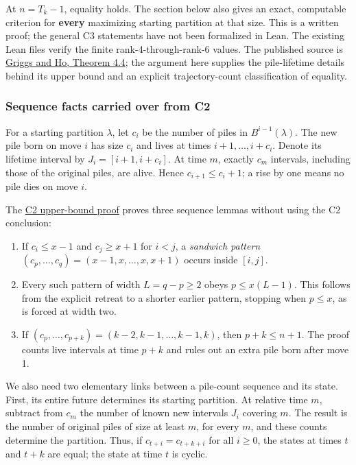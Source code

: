 \documentclass[11pt,a4paper]{article}
\providecommand{\tightlist}{\setlength{\itemsep}{0pt}\setlength{\parskip}{0pt}}
\begin{document}
At \(n=T_k-1\), equality holds. The section below also gives an exact, computable criterion for \textbf{every} maximizing starting partition at that size. This is a written proof; the general C3 statements have not been formalized in Lean. The existing Lean files verify the finite rank-4-through-rank-6 values. The published source is \href{https://sc.edu/study/colleges_schools/artsandsciences/mathematics/research/imi/research/documents/1998/1998_12.pdf}{Griggs and Ho, Theorem 4.4}; the argument here supplies the pile-lifetime details behind its upper bound and an explicit trajectory-count classification of equality.

\subsubsection{Sequence facts carried over from C2}\label{sequence-facts-carried-over-from-c2}

For a starting partition \(\lambda\), let \(c_i\) be the number of piles in \(B^{i-1}(\lambda)\). The new pile born on move \(i\) has size \(c_i\) and lives at times \(i+1,\ldots,i+c_i\). Denote its lifetime interval by \(J_i=[i+1,i+c_i]\). At time \(m\), exactly \(c_m\) intervals, including those of the original piles, are alive. Hence \(c_{i+1}\le c_i+1\); a rise by one means no pile dies on move \(i\).

The \href{https://github.com/mpelteshki/climbing-to-the-frontier/blob/212bba53b1818c08c40b8c4b48f636651eaf6410/cagent/p3/c2/upper-bound-proof.md}{C2 upper-bound proof} proves three sequence lemmas without using the C2 conclusion:

\begin{enumerate}
\def\labelenumi{\arabic{enumi}.}
\tightlist
\item
  If \(c_i\le x-1\) and \(c_j\ge x+1\) for \(i<j\), a \emph{sandwich pattern} \((c_p,\ldots,c_q)=(x-1,x,\ldots,x,x+1)\) occurs inside \([i,j]\).
\item
  Every such pattern of width \(L=q-p\ge2\) obeys \(p\le x(L-1)\). This follows from the explicit retreat to a shorter earlier pattern, stopping when \(p\le x\), as is forced at width two.
\item
  If \((c_p,\ldots,c_{p+k})=(k-2,k-1,\ldots,k-1,k)\), then \(p+k\le n+1\). The proof counts live intervals at time \(p+k\) and rules out an extra pile born after move 1.
\end{enumerate}

We also need two elementary links between a pile-count sequence and its state. First, its entire future determines its starting partition. At relative time \(m\), subtract from \(c_m\) the number of known new intervals \(J_i\) covering \(m\). The result is the number of original piles of size at least \(m\), for every \(m\), and these counts determine the partition. Thus, if \(c_{t+i}=c_{t+k+i}\) for all \(i\ge0\), the states at times \(t\) and \(t+k\) are equal; the state at time \(t\) is cyclic.
\end{document}
